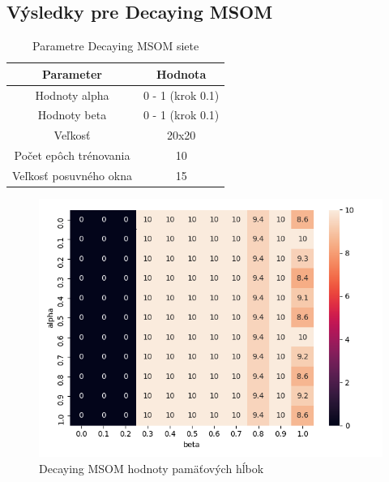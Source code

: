 \subsection{Výsledky pre Decaying MSOM}
\begin{table}[h!]
    \centering
    \begin{tabular}{|c|c|} 
     \hline
     Parameter & Hodnota \\ 
     \hline\hline
     Hodnoty alpha & 0 - 1 (krok 0.1)  \\ 
     \hline
     Hodnoty beta & 0 - 1  (krok 0.1) \\ 
     \hline
     Veľkosť & 20x20  \\
     \hline
     Počet epôch trénovania & 10  \\
     \hline
     Veľkosť posuvného okna & 15 \\
     \hline
    \end{tabular}
    \caption{Parametre Decaying MSOM siete}
    \label{table:1}
    \end{table}
    
    
    \begin{figure}[H]
        \centering
        \includegraphics[width=\textwidth]{assets/decay_msom_memory_span}
        \caption{Decaying MSOM hodnoty pamäťových hĺbok}
    \end{figure}
    

